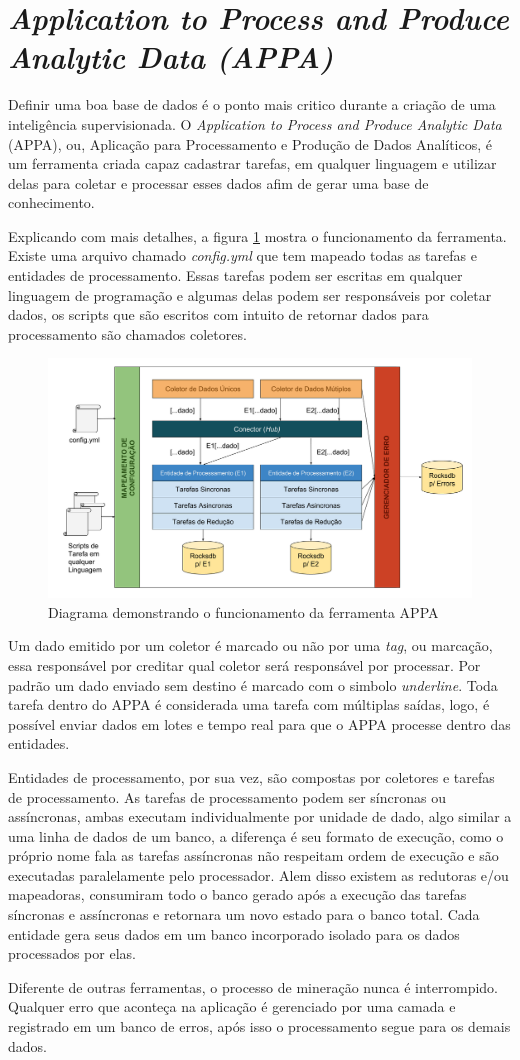 \section{\textit{Application to Process and Produce Analytic Data (APPA)}}

Definir uma boa base de dados é o ponto mais critico durante a criação de uma inteligência supervisionada. O \textit{Application to Process and Produce Analytic Data} (APPA), ou, Aplicação para Processamento e Produção de Dados Analíticos, é um ferramenta criada capaz cadastrar tarefas, em qualquer linguagem e utilizar delas para coletar e processar esses dados afim de gerar uma base de conhecimento.

Explicando com mais detalhes, a figura \ref{fig:appa_eng} mostra o funcionamento da ferramenta. Existe uma arquivo chamado \textit{config.yml} que tem mapeado todas as tarefas e entidades de processamento. Essas tarefas podem ser escritas em qualquer linguagem de programação e algumas delas podem ser responsáveis por coletar dados, os scripts que são escritos com intuito de retornar dados para processamento são chamados coletores.

\begin{figure}[H]
    \centering
    \includegraphics[width=.8\textwidth]{imagens/appa_eng.png}
    \caption{Diagrama demonstrando o funcionamento da ferramenta APPA}
    \label{fig:appa_eng}
\end{figure}

Um dado emitido por um coletor é marcado ou não por uma \textit{tag}, ou marcação, essa responsável por creditar qual coletor será responsável por processar. Por padrão um dado enviado sem destino é marcado com o simbolo \textit{underline}. Toda tarefa dentro do APPA é considerada uma tarefa com múltiplas saídas, logo, é possível enviar dados em lotes e tempo real para que o APPA processe dentro das entidades. 

Entidades de processamento, por sua vez, são compostas por coletores e tarefas de processamento. As tarefas de processamento podem ser síncronas ou assíncronas, ambas executam individualmente por unidade de dado, algo similar a uma linha de dados de um banco, a diferença é seu formato de execução, como o próprio nome fala as tarefas assíncronas não respeitam ordem de execução e são executadas paralelamente pelo processador. Alem disso existem as redutoras e/ou mapeadoras, consumiram todo o banco gerado após a execução das tarefas síncronas e assíncronas e retornara um novo estado para o banco total. Cada entidade gera seus dados em um banco incorporado isolado para os dados processados por elas.

Diferente de outras ferramentas, o processo de mineração nunca é interrompido. Qualquer erro que aconteça na aplicação é gerenciado por uma camada e registrado em um banco de erros, após isso o processamento segue para os demais dados.
